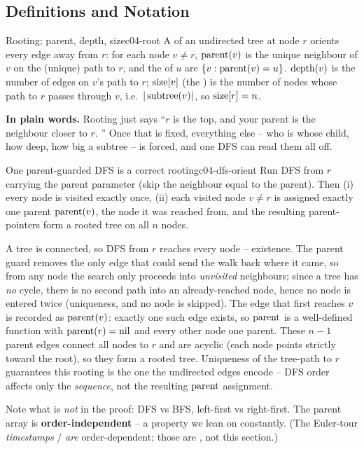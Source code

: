 \subsection{Definitions and Notation}

\begin{definition}{Rooting; parent, depth, size}{c04-root}
A  of an undirected tree at node $r$ orients every edge away from $r$: for
each node $v \neq r$, $\operatorname{parent}(v)$ is the unique neighbour of $v$ on the (unique) path to
$r$, and the  of $u$ are $\{v : \operatorname{parent}(v)=u\}$. $\operatorname{depth}(v)$ is the number
of edges on $v$'s path to $r$; $\operatorname{size}[v]$ (the ) is the number of
nodes whose path to $r$ passes through $v$, i.e.\ $|\operatorname{subtree}(v)|$, so $\operatorname{size}[r]=n$.
\end{definition}

\noindent\textbf{In plain words.} Rooting just says ``$r$ is the top, and your parent is
the neighbour closer to $r$. '' Once that is fixed, everything else -- who is whose
child, how deep, how big a subtree -- is forced, and one DFS can read them all off.

\begin{theorem}{One parent-guarded DFS is a correct rooting}{c04-dfs-orient}
Run DFS from $r$ carrying the parent parameter (skip the neighbour equal to the parent).
Then (i) every node is visited exactly once, (ii) each visited node $v \neq r$ is assigned
exactly one parent $\operatorname{parent}(v)$, the node it was reached from, and the resulting
parent-pointers form a rooted tree on all $n$ nodes.
\end{theorem}
\begin{proofbox}
A tree is connected, so DFS from $r$ reaches every node -- existence. The parent guard
removes the only edge that could send the walk back where it came, so from any node the
search only proceeds into \emph{unvisited} neighbours; since a tree has \emph{no} cycle,
there is no second path into an already-reached node, hence no node is entered twice
(uniqueness, and no node is skipped). The edge that first reaches $v$ is recorded as
$\operatorname{parent}(v)$: exactly one such edge exists, so $\operatorname{parent}$ is a well-defined function with
$\operatorname{parent}(r)=\text{nil}$ and every other node one parent. These $n-1$ parent edges connect
all nodes to $r$ and are acyclic (each node points strictly toward the root), so they form
a rooted tree. Uniqueness of the tree-path to $r$ guarantees this rooting is the one the
undirected edges encode -- DFS order affects only the \emph{sequence}, not the resulting
$\operatorname{parent}$ assignment.
\end{proofbox}
\begin{insightbox}
Note what is \emph{not} in the proof: DFS vs BFS, left-first vs right-first. The parent
array is \textbf{order-independent} -- a property we lean on constantly. (The Euler-tour
\emph{timestamps} / \emph{are} order-dependent; those are
, not this section.)
\end{insightbox}

